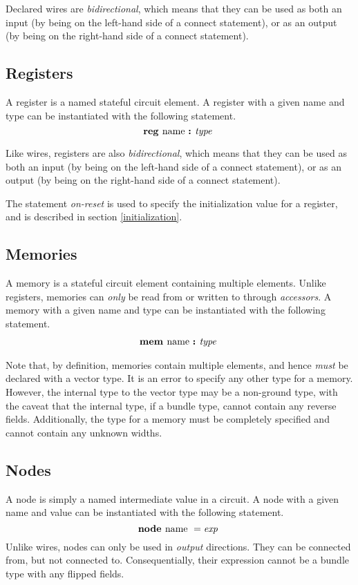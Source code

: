 \documentclass[12pt]{article}
\begin{document}
Declared wires are {\em bidirectional}, which means that they can be used as both an input (by being on the left-hand side of a connect statement), or as an output (by being on the right-hand side of a connect statement).

\subsection{Registers}
A register is a named stateful circuit element.
A register with a given name and type can be instantiated with the following statement.
\[
\text{\bf reg\ } \text{name } \text{\bf :\ } \text{\em type\ } \\
\]

Like wires, registers are also {\em bidirectional}, which means that they can be used as both an input (by being on the left-hand side of a connect statement), or as an output (by being on the right-hand side of a connect statement). 

The statement {\em on-reset} is used to specify the initialization value for a register, and is described in section \ref{initialization}. 

\subsection{Memories}
A memory is a stateful circuit element containing multiple elements.
Unlike registers, memories can {\em only} be read from or written to through {\em accessors}.
A memory with a given name and type can be instantiated with the following statement.
\[
\begin{aligned}
\text{\bf mem\ } \text{name } \text{\bf :\ } \text{\em type\ } \\
\end{aligned}
\]

Note that, by definition, memories contain multiple elements, and hence {\em must} be declared with a vector type.
It is an error to specify any other type for a memory.
However, the internal type to the vector type may be a non-ground type, with the caveat that the internal type, if a bundle type, cannot contain any reverse fields.
Additionally, the type for a memory must be completely specified and cannot contain any unknown widths.

\subsection{Nodes}
A node is simply a named intermediate value in a circuit.
A node with a given name and value can be instantiated with the following statement.
\[
\text{\bf node\ } \text{name } = \text{\em exp\ } \\
\]
Unlike wires, nodes can only be used in {\em output} directions.
They can be connected from, but not connected to.
Consequentially, their expression cannot be a bundle type with any flipped fields.
\end{document}
